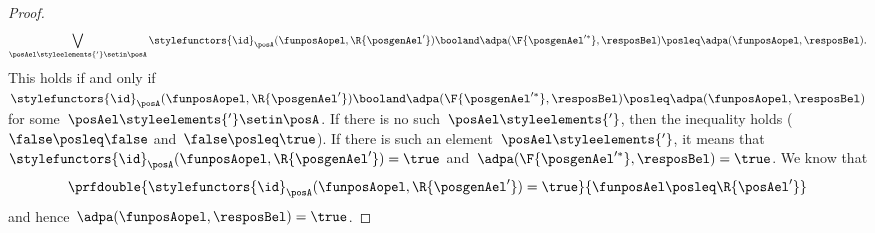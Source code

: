 \begin{proof}
\begin{equation}
        \bigvee_{\posAel\styleelements{'}\setin \posA}\stylefunctors{\id}_\posA(\funposAopel,\R{\posgenAel'})\booland \adpa(\F{\posgenAel'^*},\resposBel) \posleq \adpa(\funposAopel,\resposBel).
    \end{equation}
    This holds if and only if~$\stylefunctors{\id}_\posA(\funposAopel,\R{\posgenAel'})\booland \adpa(\F{\posgenAel'^*},\resposBel) \posleq \adpa(\funposAopel,\resposBel)$ for some~$\posAel\styleelements{'}\setin \posA$.
    If there is no such~$\posAel\styleelements{'}$, then the inequality holds ($\false \posleq \false$ and~$\false \posleq \true$).
    If there is such an element~$\posAel\styleelements{'}$, it means that~$\stylefunctors{\id}_\posA(\funposAopel,\R{\posgenAel'})=\true$ and~$\adpa(\F{\posgenAel'^*},\resposBel)=\true$.
    We know that
    \begin{equation}
        \prfdouble{\stylefunctors{\id}_\posA(\funposAopel,\R{\posgenAel'})=\true}{\funposAel \posleq \R{\posAel'}}
    \end{equation}
    and hence~$\adpa(\funposAopel,\resposBel)=\true$.
\end{proof}

